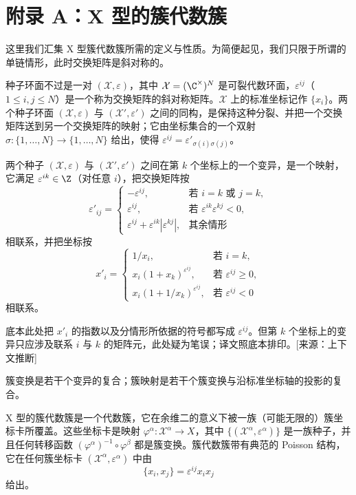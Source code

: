 
\section{附录 A：X 型的簇代数簇}

这里我们汇集 X 型簇代数簇所需的定义与性质。为简便起见，我们只限于所谓的单链情形，此时交换矩阵是斜对称的。

种子环面不过是一对 $(\mathcal{X},\varepsilon)$，其中 $\mathcal{X}=(\C^\times)^N$ 是可裂代数环面，$\varepsilon^{ij}$（$1\leqslant i,j\leqslant N$）是一个称为交换矩阵的斜对称矩阵。$\mathcal{X}$ 上的标准坐标记作 $\{x_i\}$。两个种子环面 $(\mathcal{X},\varepsilon)$ 与 $(\mathcal{X}',\varepsilon')$ 之间的同构，是保持这种分裂、并把一个交换矩阵送到另一个交换矩阵的映射；它由坐标集合的一个双射 $\sigma\colon\{1,\dots,N\}\to\{1,\dots,N\}$ 给出，使得 $\varepsilon^{ij}=\varepsilon'_{\sigma(i)\sigma(j)}$。

两个种子 $(\mathcal{X},\varepsilon)$ 与 $(\mathcal{X}',\varepsilon')$ 之间在第 $k$ 个坐标上的一个变异，是一个映射，它满足 $\varepsilon^{ik}\in\Z$（对任意 $i$），把交换矩阵按
\[
\varepsilon'_{ij}=
\begin{cases}
-\varepsilon^{ij}, & \text{若 } i=k \text{ 或 } j=k,\\
\varepsilon^{ij}, & \text{若 } \varepsilon^{ik}\varepsilon^{kj}<0,\\
\varepsilon^{ij}+\varepsilon^{ik}|\varepsilon^{kj}|, & \text{其余情形}
\end{cases}
\]
相联系，并把坐标按
\[
x'_i=
\begin{cases}
1/x_i, & \text{若 } i=k,\\
x_i(1+x_k)^{\varepsilon^{ij}}, & \text{若 } \varepsilon^{ij}\geqslant 0,\\
x_i(1+1/x_k)^{\varepsilon^{ij}}, & \text{若 } \varepsilon^{ij}<0
\end{cases}
\]
相联系。\begin{annote}底本此处把 $x'_i$ 的指数以及分情形所依据的符号都写成 $\varepsilon^{ij}$。但第 $k$ 个坐标上的变异只应涉及联系 $i$ 与 $k$ 的矩阵元，此处疑为笔误；译文照底本排印。[来源：上下文推断]\end{annote}

簇变换是若干个变异的复合；簇映射是若干个簇变换与沿标准坐标轴的投影的复合。

X 型的簇代数簇是一个代数簇，它在余维二的意义下被一族（可能无限的）簇坐标卡所覆盖。这些坐标卡是映射 $\varphi^\alpha\colon\mathcal{X}^\alpha\to X$，其中 $\{(\mathcal{X}^\alpha,\varepsilon^\alpha)\}$ 是一族种子，并且任何转移函数 $(\varphi^\alpha)^{-1}\circ\varphi^\beta$ 都是簇变换。簇代数簇带有典范的 Poisson 结构，它在任何簇坐标卡 $(\mathcal{X}^\alpha,\varepsilon^\alpha)$ 中由
\begin{equation}
\{x_i,x_j\}=\varepsilon^{ij}x_ix_j
\tag{1.57}
\label{eq:1.57}
\end{equation}
给出。

